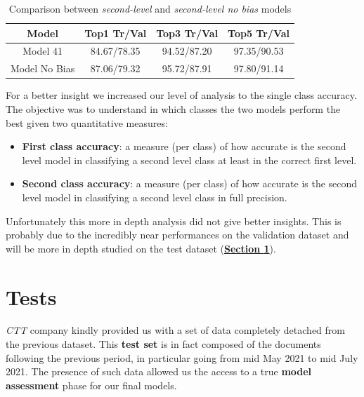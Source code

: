 \documentclass[12pt]{article}
\begin{document}
\begin{table}[ht!]
    \begin{adjustwidth}{}{}
	    \centering
	    \small
	    \begin{tabular}{ |c|c|c|c| }
        \hline
        \textbf{Model} & \textbf{Top1 Tr/Val} & \textbf{Top3 Tr/Val} & \textbf{Top5 Tr/Val}\\
        \hline
        Model 41 & 84.67/78.35 & 94.52/87.20 & 97.35/90.53\\
        Model No Bias & 87.06/79.32 & 95.72/87.91 & 97.80/91.14\\
        \hline
        \end{tabular}
    \end{adjustwidth}
    \captionsetup{justification   = centering}
    \caption{Comparison between \textit{second-level} and \textit{second-level no bias} models}
    \label{tb:secondnobias}
\end{table}

For a better insight we increased our level of analysis to the single class accuracy. The objective was to understand in which classes the two models perform the best given two quantitative measures:
\begin{itemize}
    \item \textbf{First class accuracy}: a measure (per class) of how accurate is the second level model in classifying a second level class at least in the correct first level.
    \item \textbf{Second class accuracy}: a measure (per class) of how accurate is the second level model in classifying a second level class in full precision.
\end{itemize}
Unfortunately this more in depth analysis did not give better insights. This is probably due to the incredibly near performances on the validation dataset and will be more in depth studied on the test dataset (\hyperref[sec:test]{\textbf{Section \ref{sec:test}}}).

\section{Tests}\label{sec:test}
\textit{CTT} company kindly provided us with a set of data completely detached from the previous dataset. This \textbf{test set} is in fact composed of the documents following the previous period, in particular going from mid May 2021 to mid July 2021. The presence of such data allowed us the access to a true \textbf{model assessment} phase for our final models.
\end{document}
